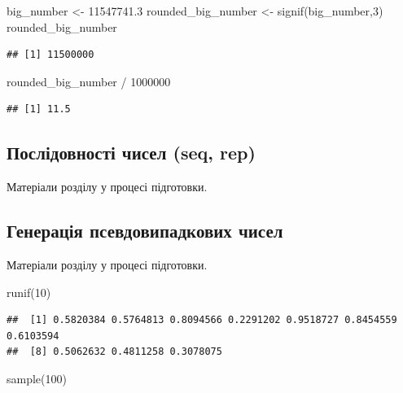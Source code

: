 \documentclass[
]{book}
\newenvironment{Shaded}{\begin{snugshade}}{\end{snugshade}}
\newcommand{\DecValTok}[1]{\textcolor[rgb]{0.00,0.00,0.81}{#1}}
\newcommand{\FloatTok}[1]{\textcolor[rgb]{0.00,0.00,0.81}{#1}}
\newcommand{\FunctionTok}[1]{\textcolor[rgb]{0.00,0.00,0.00}{#1}}
\newcommand{\NormalTok}[1]{#1}
\newcommand{\OtherTok}[1]{\textcolor[rgb]{0.56,0.35,0.01}{#1}}
\newcommand{\SpecialCharTok}[1]{\textcolor[rgb]{0.00,0.00,0.00}{#1}}
\begin{document}
\begin{Shaded}
\begin{Highlighting}[]
\NormalTok{big\_number }\OtherTok{\textless{}{-}} \FloatTok{11547741.3}
\NormalTok{rounded\_big\_number }\OtherTok{\textless{}{-}} \FunctionTok{signif}\NormalTok{(big\_number,}\DecValTok{3}\NormalTok{)}
\NormalTok{rounded\_big\_number}
\end{Highlighting}
\end{Shaded}

\begin{verbatim}
## [1] 11500000
\end{verbatim}

\begin{Shaded}
\begin{Highlighting}[]
\NormalTok{rounded\_big\_number }\SpecialCharTok{/} \DecValTok{1000000}
\end{Highlighting}
\end{Shaded}

\begin{verbatim}
## [1] 11.5
\end{verbatim}

\hypertarget{chapter242}{%
\subsection{Послідовності чисел (seq, rep)}\label{chapter242}}

Матеріали розділу у процесі підготовки.

\hypertarget{chapter243}{%
\subsection{Генерація псевдовипадкових чисел}\label{chapter243}}

Матеріали розділу у процесі підготовки.

\begin{Shaded}
\begin{Highlighting}[]
\FunctionTok{runif}\NormalTok{(}\DecValTok{10}\NormalTok{)}
\end{Highlighting}
\end{Shaded}

\begin{verbatim}
##  [1] 0.5820384 0.5764813 0.8094566 0.2291202 0.9518727 0.8454559 0.6103594
##  [8] 0.5062632 0.4811258 0.3078075
\end{verbatim}

\begin{Shaded}
\begin{Highlighting}[]
\FunctionTok{sample}\NormalTok{(}\DecValTok{100}\NormalTok{)}
\end{Highlighting}
\end{Shaded}
\end{document}
